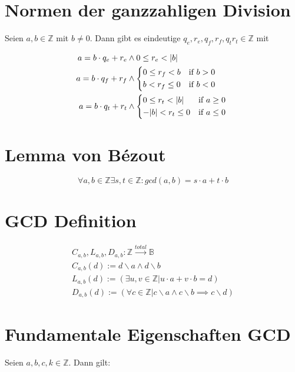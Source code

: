 \documentclass[a4paper, ngerman, landscape, fleqn]{article}
\begin{document}
\begin{multicols*}{3}
\section*{Normen der ganzzahligen Division}
Seien $a, b \in \mathbb{Z}$ mit $b \neq 0$. Dann gibt es eindeutige $q_e, r_e, q_f, r_f, q_t r_t \in \mathbb{Z}$ mit

\begin{align*}
    a = b \cdot q_e + r_e &\wedge 0 \leq r_e < | b | \\
    a = b \cdot q_f + r_f &\wedge 
    \begin{cases*}
        0 \leq r_f < b & if $b > 0$ \\
        b < r_f \leq 0 & if $b < 0$
    \end{cases*} \\
    a = b \cdot q_t + r_t &\wedge 
    \begin{cases*}
        0 \leq r_t < |b| & if $a \geq 0$ \\
        -|b| < r_t \leq 0 & if $a \leq 0$
    \end{cases*}
\end{align*}


\section*{Lemma von Bézout}
\begin{equation*}
    \forall a, b \in \mathbb{Z} \exists s, t \in \mathbb{Z} : gcd(a, b) = s \cdot a + t \cdot b
\end{equation*}

\section*{GCD Definition}
\begin{align*}
    C_{a, b}, L_{a, b}, D_{a, b} : \mathbb{Z} \xrightarrow{total} \mathbb{B} \\
    C_{a, b}(d) := d \backslash a \wedge d \backslash b \\
    L_{a, b}(d) := (\exists u, v \in \mathbb{Z} | u \cdot a + v \cdot b = d) \\
    D_{a, b}(d) := (\forall c \in \mathbb{Z} | c \backslash a \wedge c \backslash b \implies c \backslash d)
\end{align*}

\section*{Fundamentale Eigenschaften GCD}
Seien $a, b, c, k \in \mathbb{Z}$. Dann gilt:


\end{multicols*}
\end{document}
